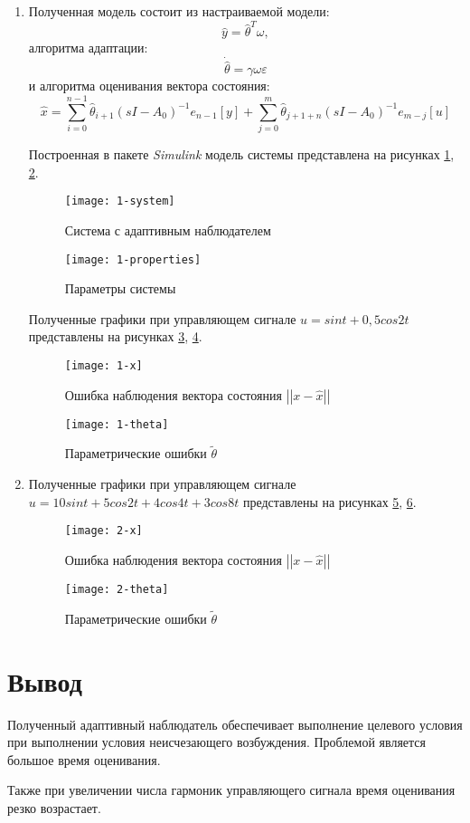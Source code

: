 \documentclass[14pt, a4paper]{extarticle}
\begin{document}
	\begin{enumerate}
		\item Полученная модель состоит из настраиваемой модели:
		$$\hat{y}=\hat{\theta}^T\omega,$$
		алгоритма адаптации:
		$$\dot{\hat{\theta}}=\gamma\omega\varepsilon$$
		и алгоритма оценивания вектора состояния:
		$$\hat{x}=\sum_{i=0}^{n-1}\hat{\theta}_{i+1}\left(sI-A_0\right)^{-1} e_{n-1}\left[y\right] + \sum_{j=0}^{m}\hat{\theta}_{j+1+n}\left(sI-A_0\right)^{-1} e_{m-j}\left[u\right]$$
		
		Построенная в пакете \textit{Simulink} модель системы представлена на рисунках \ref{fig:1-system}, \ref{fig:1-properties}.
		
		\begin{figure}[H]
			\centering
			\texttt{[image: 1-system]}
			\caption{Система с адаптивным наблюдателем}
			\label{fig:1-system}
		\end{figure}
		
		\begin{figure}[H]
			\centering
			\texttt{[image: 1-properties]}
			\caption{Параметры системы}
			\label{fig:1-properties}
		\end{figure}
		
		Полученные графики при управляющем сигнале $u=sint+0,5cos2t$ представлены на рисунках \ref{fig:1-x}, \ref{fig:1-theta}.
		
		\begin{figure}[H]
			\centering
			\texttt{[image: 1-x]}
			\caption{Ошибка наблюдения вектора состояния $\left|\left|x-\hat{x}\right|\right|$}
			\label{fig:1-x}
		\end{figure}
		
		\begin{figure}[H]
			\centering
			\texttt{[image: 1-theta]}
			\caption{Параметрические ошибки $\tilde{\theta}$}
			\label{fig:1-theta}
		\end{figure}
		
		\item Полученные графики при управляющем сигнале $u=10sint+5cos2t + 4cos4t+3cos8t$ представлены на рисунках \ref{fig:2-x}, \ref{fig:2-theta}.
		
		\begin{figure}[H]
			\centering
			\texttt{[image: 2-x]}
			\caption{Ошибка наблюдения вектора состояния $\left|\left|x-\hat{x}\right|\right|$}
			\label{fig:2-x}
		\end{figure}
		
		\begin{figure}[H]
			\centering
			\texttt{[image: 2-theta]}
			\caption{Параметрические ошибки $\tilde{\theta}$}
			\label{fig:2-theta}
		\end{figure}
		
	\end{enumerate}
	
	\newpage
	
	\section*{Вывод}
	
	Полученный адаптивный наблюдатель обеспечивает выполнение целевого условия при выполнении условия неисчезающего возбуждения. Проблемой является большое время оценивания.
	
	Также при увеличении числа гармоник управляющего сигнала время оценивания резко возрастает.
	
\end{document}
